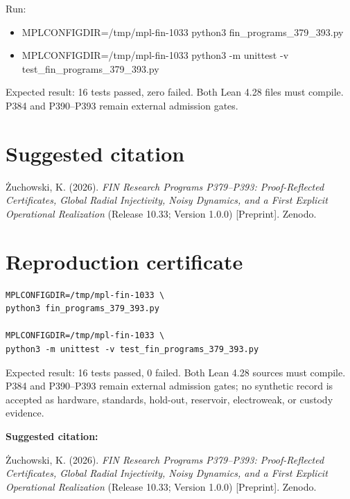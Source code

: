 \documentclass[11pt,a4paper,openany]{report}
\begin{document}
Run:

\begin{itemize}
\item 
MPLCONFIGDIR=/\allowbreak{}tmp/\allowbreak{}mpl-fin-1033 python3 fin\_programs\_379\_393.py

\item 
MPLCONFIGDIR=/\allowbreak{}tmp/\allowbreak{}mpl-fin-1033 python3 -m unittest -v test\_fin\_programs\_379\_393.py

\end{itemize}

Expected result: 16 tests passed, zero failed. Both Lean 4.28 files must compile. P384 and P390--P393 remain external admission gates.

\chapter{Suggested citation}

\.Zuchowski, K. (2026). \emph{FIN Research Programs P379--P393: Proof-Reflected Certificates, Global Radial Injectivity, Noisy Dynamics, and a First Explicit Operational Realization} (Release 10.33; Version 1.0.0) [Preprint]. Zenodo.


\clearpage
\chapter*{Reproduction certificate}
\begin{Verbatim}[fontsize=\small]
MPLCONFIGDIR=/tmp/mpl-fin-1033 \
python3 fin_programs_379_393.py

MPLCONFIGDIR=/tmp/mpl-fin-1033 \
python3 -m unittest -v test_fin_programs_379_393.py
\end{Verbatim}
Expected result: 16 tests passed, 0 failed. Both Lean 4.28 sources must
compile. P384 and P390--P393 remain external admission gates; no synthetic
record is accepted as hardware, standards, hold-out, reservoir, electroweak,
or custody evidence.

\medskip
\noindent\textbf{Suggested citation:}

\.Zuchowski, K. (2026). \emph{FIN Research Programs P379--P393:
Proof-Reflected Certificates, Global Radial Injectivity, Noisy Dynamics, and
a First Explicit Operational Realization} (Release 10.33; Version 1.0.0)
[Preprint]. Zenodo.
\end{document}
